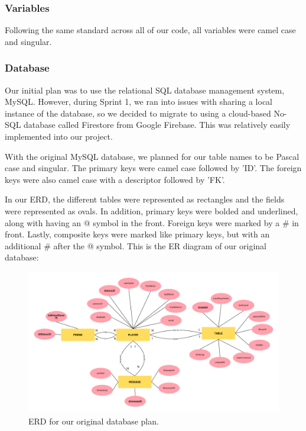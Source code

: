 \subsubsection{Variables}
Following the same standard across all of our code, all variables were camel case and singular. 

\subsubsection{Database}
\label{sec:database}
Our initial plan was to use the relational SQL database management system, MySQL. However, during Sprint 1, we ran into issues with sharing a local instance of the database, so we decided to migrate to using a cloud-based No-SQL database called Firestore from Google Firebase. This was relatively easily implemented into our project.

With the original MySQL database, we planned for our table names to be Pascal case and singular. The primary keys were camel case followed by 'ID'. The foreign keys were also camel case with a descriptor followed by 'FK'.

In our ERD, the different tables were represented as rectangles and the fields were represented as ovals. In addition, primary keys were bolded and underlined, along with having an @ symbol in the front. Foreign keys were marked by a \# in front. Lastly, composite keys were marked like primary keys, but with an additional \# after the @ symbol. This is the ER diagram of our original database: 

\begin{figure}[hbt!]
    \centering
    \includegraphics[width=1.0\linewidth]{figures/SE Database ERD.pdf}
    \caption{ERD for our original database plan.}
    \label{fig:ERD}
\end{figure} 

